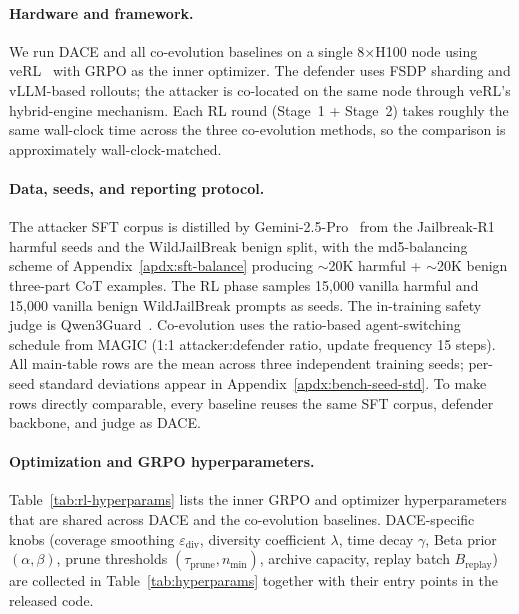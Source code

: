 \documentclass{article}
\newcommand{\method}{\textsc{DACE}\xspace}
\begin{document}
\paragraph{Hardware and framework.}
We run \method and all co-evolution baselines on a single 8$\times$H100 node using veRL~\citep{sheng2025verl} with GRPO as the inner optimizer. The defender uses FSDP sharding and vLLM-based rollouts; the attacker is co-located on the same node through veRL's hybrid-engine mechanism. Each RL round (Stage~1 + Stage~2) takes roughly the same wall-clock time across the three co-evolution methods, so the comparison is approximately wall-clock-matched.

\paragraph{Data, seeds, and reporting protocol.}
The attacker SFT corpus is distilled by Gemini-2.5-Pro~\citep{comanici2025gemini} from the Jailbreak-R1 harmful seeds and the WildJailBreak benign split, with the md5-balancing scheme of Appendix~\ref{apdx:sft-balance} producing $\sim$20K harmful + $\sim$20K benign three-part CoT examples. The RL phase samples 15{,}000 vanilla harmful and 15{,}000 vanilla benign WildJailBreak prompts as seeds. The in-training safety judge is Qwen3Guard~\citep{zhao2025qwen3guard}. Co-evolution uses the ratio-based agent-switching schedule from MAGIC (1:1 attacker:defender ratio, update frequency 15 steps). All main-table rows are the mean across three independent training seeds; per-seed standard deviations appear in Appendix~\ref{apdx:bench-seed-std}. To make rows directly comparable, every baseline reuses the same SFT corpus, defender backbone, and judge as \method.

\paragraph{Optimization and GRPO hyperparameters.}
Table~\ref{tab:rl-hyperparams} lists the inner GRPO and optimizer hyperparameters that are shared across \method and the co-evolution baselines. \method-specific knobs (coverage smoothing $\varepsilon_{\mathrm{div}}$, diversity coefficient $\lambda$, time decay $\gamma$, Beta prior $(\alpha, \beta)$, prune thresholds $(\tau_{\mathrm{prune}}, n_{\min})$, archive capacity, replay batch $B_{\mathrm{replay}}$) are collected in Table~\ref{tab:hyperparams} together with their entry points in the released code.
\end{document}

